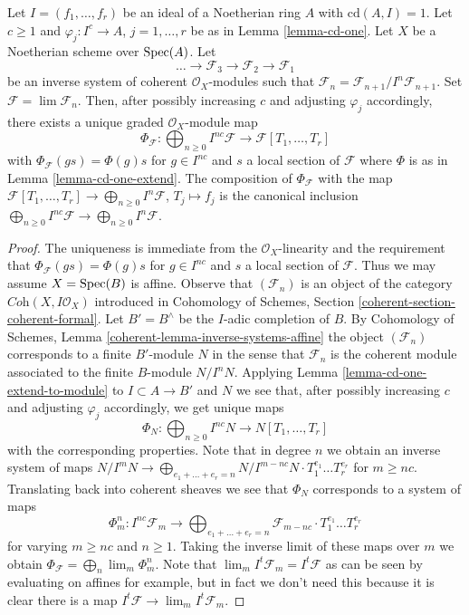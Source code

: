 \begin{lemma}
\label{lemma-cd-is-one-for-system}
Let $I = (f_1, \ldots, f_r)$ be an ideal of a Noetherian ring $A$ with
$\text{cd}(A, I) = 1$. Let $c \geq 1$ and $\varphi_j : I^c \to A$,
$j = 1, \ldots, r$ be as in Lemma \ref{lemma-cd-one}.
Let $X$ be a Noetherian scheme over $\mathop{\mathrm{Spec}}(A)$. Let
$$
\ldots \to \mathcal{F}_3 \to \mathcal{F}_2 \to \mathcal{F}_1
$$
be an inverse system of coherent $\mathcal{O}_X$-modules
such that $\mathcal{F}_n = \mathcal{F}_{n + 1}/I^n\mathcal{F}_{n + 1}$.
Set $\mathcal{F} = \lim \mathcal{F}_n$.
Then, after possibly increasing $c$ and adjusting $\varphi_j$ accordingly,
there exists a unique graded $\mathcal{O}_X$-module map
$$
\Phi_\mathcal{F} :
\bigoplus\nolimits_{n \geq 0} I^{nc}\mathcal{F}
\longrightarrow
\mathcal{F}[T_1, \ldots, T_r]
$$
with $\Phi_\mathcal{F}(g s) = \Phi(g) s$ for $g \in I^{nc}$ and
$s$ a local section of $\mathcal{F}$ where $\Phi$ is as in
Lemma \ref{lemma-cd-one-extend}. The composition of $\Phi_\mathcal{F}$
with the map
$\mathcal{F}[T_1, \ldots, T_r] \to \bigoplus_{n \geq 0} I^n\mathcal{F}$,
$T_j \mapsto f_j$
is the canonical inclusion
$\bigoplus_{n \geq 0} I^{nc}\mathcal{F} \to
\bigoplus_{n \geq 0} I^n\mathcal{F}$.
\end{lemma}

\begin{proof}
The uniqueness is immediate from the $\mathcal{O}_X$-linearity
and the requirement that $\Phi_\mathcal{F}(g s) = \Phi(g) s$ for
$g \in I^{nc}$ and $s$ a local section of $\mathcal{F}$.
Thus we may assume $X = \mathop{\mathrm{Spec}}(B)$ is affine.
Observe that $(\mathcal{F}_n)$ is an object of the category
$\textit{Coh}(X, I\mathcal{O}_X)$ introduced
in Cohomology of Schemes, Section \ref{coherent-section-coherent-formal}.
Let $B' = B^\wedge$ be the $I$-adic completion of $B$.
By Cohomology of Schemes, Lemma \ref{coherent-lemma-inverse-systems-affine}
the object $(\mathcal{F}_n)$ corresponds to a finite $B'$-module $N$
in the sense that $\mathcal{F}_n$ is the coherent
module associated to the finite $B$-module $N/I^n N$.
Applying Lemma \ref{lemma-cd-one-extend-to-module}
to $I \subset A \to B'$ and $N$
we see that, after possibly increasing $c$ and adjusting
$\varphi_j$ accordingly, we get unique maps
$$
\Phi_N : \bigoplus\nolimits_{n \geq 0} I^{nc}N \to N[T_1, \ldots, T_r]
$$
with the corresponding properties. Note that in degree $n$ we obtain
an inverse system of maps $N/I^mN \to \bigoplus_{e_1 + \ldots + e_r = n}
N/I^{m - nc}N \cdot T_1^{e_1} \ldots T_r^{e_r}$ for $m \geq nc$.
Translating back into coherent
sheaves we see that $\Phi_N$ corresponds to a system of maps
$$
\Phi^n_m :
I^{nc}\mathcal{F}_m
\longrightarrow
\bigoplus\nolimits_{e_1 + \ldots + e_r = n}
\mathcal{F}_{m - nc} \cdot T_1^{e_1} \ldots T_r^{e_r}
$$
for varying $m \geq nc$ and $n \geq 1$. Taking the inverse limit of
these maps over $m$ we obtain $\Phi_\mathcal{F} = \bigoplus_n \lim_m \Phi^n_m$.
Note that $\lim_m I^t\mathcal{F}_m = I^t \mathcal{F}$ as can be seen by
evaluating on affines for example, but in fact we don't need this because
it is clear there is a map $I^t\mathcal{F} \to \lim_m I^t\mathcal{F}_m$.
\end{proof}

